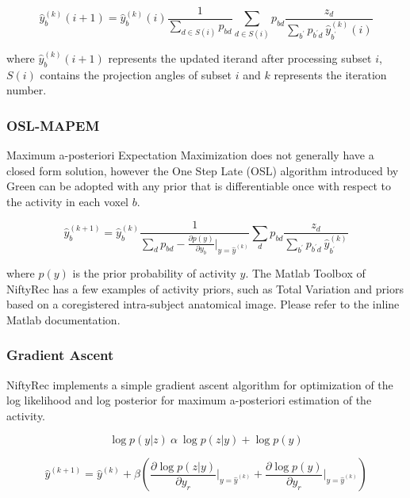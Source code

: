 \documentclass[12pt,a4paper]{report}
\begin{document}
\begin{equation}
 \hat{y}_b^{(k)}(i+1) = \hat{y}_b^{(k)}(i) \frac{1}{\sum_{d\in S(i)}{p_{bd}}} \sum_{d\in S(i)}{p_{bd}\frac{z_d}{\sum_{b^{\prime}}p_{b^{\prime}d}\ \hat{y}^{(k)}_{b^{\prime}}(i)}}
\end{equation}

\noindent where $\hat{y}_b^{(k)}(i+1)$ represents the updated iterand after processing subset $i$, $S(i)$ contains the projection angles of subset $i$ and $k$ represents the iteration number. 

\subsubsection{OSL-MAPEM}
Maximum a-posteriori Expectation Maximization does not generally have a closed form solution, however the One Step Late (OSL) algorithm 
introduced by Green \cite{Green} can be adopted with any prior that is differentiable once with respect to the activity in each voxel $b$. 

\begin{equation}
 \hat{y}_b^{(k+1)} = \hat{y}_b^{(k)} \frac{1}{\sum_{d}{p_{bd}} - \frac{\partial{p(y)}}{\partial{y_b}}\vert_{y=\hat{y}^{(k)}}} \sum_{d}{p_{bd}\frac{z_d}{\sum_{b^{\prime}}p_{b^{\prime}d}\ \hat{y}^{(k)}_{b^{\prime}}}}
\end{equation}

\noindent where $p(y)$ is the prior probability of activity $y$. The Matlab Toolbox of NiftyRec has a few examples of activity priors, such as Total Variation and priors 
based on a coregistered intra-subject anatomical image. Please refer to the inline Matlab documentation. 

\subsubsection{Gradient Ascent}
NiftyRec implements a simple gradient ascent algorithm for optimization of the log likelihood and log posterior for maximum a-posteriori estimation of the activity. 

\begin{equation}
 \log p(y|z)\ \alpha\ \log p(z|y) + \log p(y)
\end{equation}

\begin{equation}
 \hat{y}^{(k+1)} = \hat{y}^{(k)} + \beta \left(\frac{\partial\log p(z|y)}{\partial y_{r}}\vert_{y=\hat{y}^{(k)}} + \frac{\partial\log p(y)}{\partial y_{r}}\vert_{y=\hat{y}^{(k)}} \right)
\end{equation}
\end{document}
